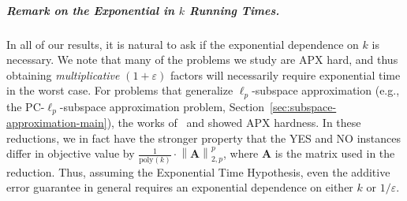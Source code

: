 \documentclass[11pt]{article}
\newcommand{\norm}[1]{\left\lVert#1\right\rVert}
\theoremstyle{plain}
\theoremstyle{plain}
\theoremstyle{definition}
\theoremstyle{plain}
\theoremstyle{remark}
\newcommand{\eps}{\varepsilon}
\DeclareRobustCommand{\fairSAp}[1]{PC-$\ell_{#1}$-subspace approximation}
\begin{document}
\subparagraph*{Remark on the Exponential in $k$ Running Times.} In all of our results, it is natural to ask if the exponential dependence on $k$ is necessary. We note that many of the problems we study are APX hard, and thus obtaining \emph{multiplicative} $(1+\eps)$ factors will necessarily require exponential time in the worst case. For problems that generalize $\ell_p$-subspace approximation (e.g., the \fairSAp{p} problem, Section~\ref{sec:subspace-approximation-main}), the works of~\cite{guruswami2016bypass} and \cite{clarkson2015input} showed APX hardness. In these reductions, we in fact have the stronger property that the YES and NO instances differ in objective value by $\frac{1}{\text{poly}(k)} \cdot \norm{\bm{A}}_{2,p}^p$, where $\bm{A}$ is the matrix used in the reduction. Thus, assuming the Exponential Time Hypothesis, even the additive error guarantee in general requires an exponential dependence on either $k$ or $1/\eps$.
\end{document}
